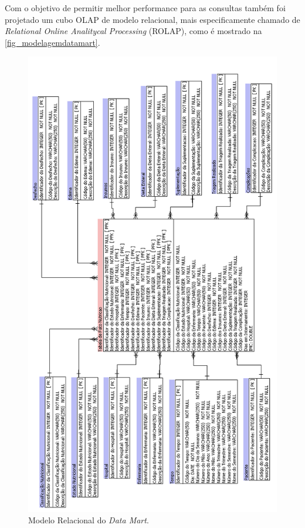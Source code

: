 Com o objetivo de permitir melhor performance para as consultas também foi projetado um cubo OLAP de modelo relacional, mais especificamente chamado de \textit{Relational Online Analitycal Processing} (ROLAP), como é mostrado na \autoref{fig_modelagemdatamart}.

\begin{figure}[htb]
	\caption{\label{fig_modelagemdatamart}Modelo Relacional do \textit{Data Mart}.}
	\begin{center}
	    \includegraphics[scale=0.5798]{Imagens/figura - modelagem multidimensional datamart.png}
	\end{center}
\end{figure}

